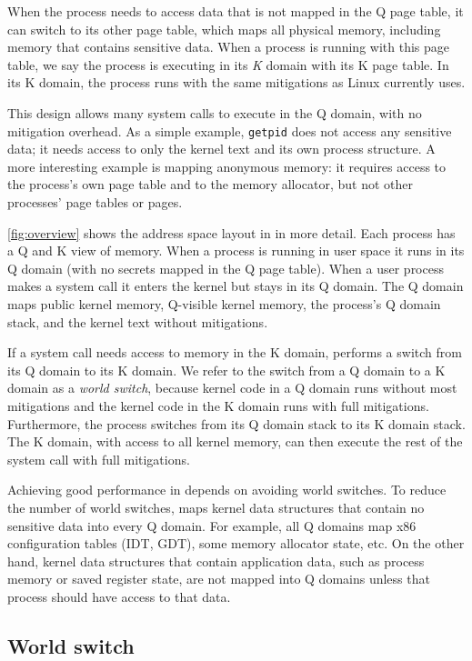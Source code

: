 When the process needs to access data that is not mapped in the Q page
table, it can switch to its other page table, which maps all physical
memory, including memory that contains sensitive data.  When a process
is running with this page table, we say the process is executing in
its \textit{K} domain with its K page table.  In its K domain, the process
runs with the same mitigations as Linux currently uses.

This design allows many system calls to execute in the Q domain,
with no mitigation overhead.  As a simple example,
\texttt{getpid} does not access any sensitive data; it needs
access to only the kernel text and its own process structure.  A more
interesting example is mapping anonymous memory: it requires access
to the process's own page table and to the memory allocator, but not
other processes' page tables or pages.

\autoref{fig:overview} shows the address space layout in \sys in more
detail.  Each process has a Q and K view of memory.  When a process is
running in user space it runs in its Q domain (with no secrets mapped
in the Q page table).  When a user process makes a system call it
enters the kernel but stays in its Q domain.  The Q domain maps public
kernel memory, Q-visible kernel memory, the process's Q domain stack,
and the kernel text without mitigations.

If a system call needs access to memory in the K domain, \sys performs a
switch from its Q domain to its K domain. We refer to the switch from a Q
domain to a K domain as a \textit{world switch}, because kernel code in
a Q domain runs without most mitigations and the kernel code in the K domain
runs with full mitigations. Furthermore, the process switches from its
Q domain stack to its K domain stack.  The K domain, with access to
all kernel memory, can then execute the rest of the system call with
full mitigations.

Achieving good performance in \sys depends on avoiding world switches.
To reduce the number of world switches, \sys maps kernel data
structures that contain no sensitive data into every Q domain.  For
example, all Q domains map x86 configuration tables (IDT, GDT), some
memory allocator state, etc.  On the other hand, kernel data structures
that contain application data, such as process memory or saved register
state, are not mapped into Q domains unless that process should have
access to that data.

\subsection*{World switch}
\label{ss:switch}

